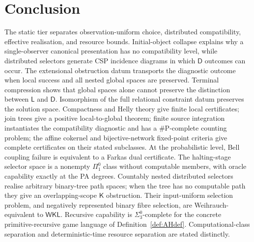 \documentclass[11pt]{article}
\theoremstyle{plain}
\theoremstyle{definition}
\theoremstyle{remark}
\begin{document}
\section{Conclusion}\label{sec:conclusion}

The static tier separates observation-uniform choice, distributed compatibility,
effective realisation, and resource bounds. Initial-object collapse explains
why a single-observer canonical presentation has no compatibility
level, while distributed selectors generate CSP incidence diagrams in which
$\mathsf D$ outcomes can occur.
The extensional obstruction datum transports the diagnostic outcome when local
success and all nested global spaces are preserved. Terminal compression shows
that global spaces alone cannot preserve the distinction between $\mathsf L$
and $\mathsf D$. Isomorphism of the full relational constraint datum preserves
the solution space. Compactness and Helly theory give finite local certificates;
join trees give a positive local-to-global theorem; finite source integration
instantiates the compatibility diagnostic and has a $\#\mathrm P$-complete
counting problem; the affine cokernel and bijective-network fixed-point criteria
give complete certificates on their stated subclasses.
At the probabilistic level, Bell coupling failure is equivalent to a Farkas dual
certificate. The halting-stage selector space is a nonempty $\Pi^0_1$ class
without computable members, with oracle capability exactly at the PA degrees.
Countably nested distributed selectors realise arbitrary binary-tree path spaces;
when the tree has no computable path they give an overlapping-scope
$\mathsf K$ obstruction. Their input-uniform selection problem, and negatively
represented binary fibre selection, are Weihrauch-equivalent to $\mathsf{WKL}$.
Recursive capability is $\Sigma^0_3$-complete for the concrete
primitive-recursive game language of Definition~\ref{def:AHdef}. Computational-class separation and
deterministic-time resource separation are stated distinctly.
\end{document}

